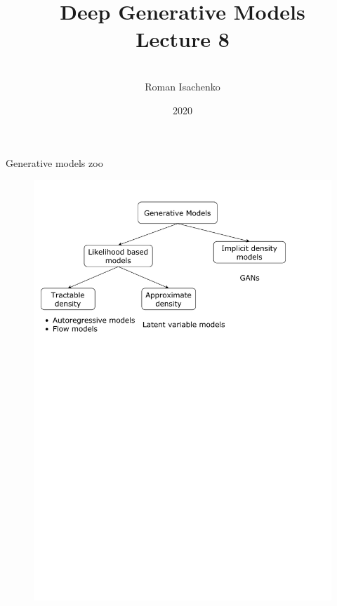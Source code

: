 \documentclass{beamer}
\title[\hbox to 56mm{Deep Generative Models  \hfill\insertframenumber\,/\,\inserttotalframenumber}]
{Deep Generative Models \\ Lecture 8}
\author[Roman Isachenko]{\\Roman Isachenko}
\institute[MIPT]{Moscow Institute of Physics and Technology \\
}
\date{2020}
\begin{document}
\begin{frame}
\titlepage
\end{frame}
\begin{frame}{Generative models zoo}
\begin{figure}
	\centering
	\includegraphics[width=1.0\linewidth]{figs/generative_models_zoo.pdf}
\end{figure}
\end{frame}
\end{document}
